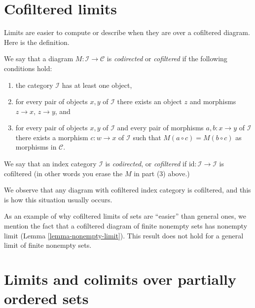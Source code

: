 \section{Cofiltered limits}
\label{section-codirected-limits}

\noindent
Limits are easier to compute or describe when they
are over a cofiltered diagram. Here is the definition.

\begin{definition}
\label{definition-codirected}
We say that a diagram $M : \mathcal{I} \to \mathcal{C}$ is {\it codirected}
or {\it cofiltered} if the following conditions hold:
\begin{enumerate}
\item the category $\mathcal{I}$ has at least one object,
\item for every pair of objects $x, y$ of $\mathcal{I}$
there exists an object $z$ and morphisms $z \to x$,
$z \to y$, and
\item for every pair of objects $x, y$ of $\mathcal{I}$
and every pair of morphisms $a, b : x \to y$ of $\mathcal{I}$
there exists a morphism $c : w \to x$ of $\mathcal{I}$
such that $M(a \circ c) = M(b \circ c)$ as morphisms in $\mathcal{C}$.
\end{enumerate}
We say that an index category $\mathcal{I}$ is {\it codirected}, or
{\it cofiltered} if $\text{id} : \mathcal{I} \to \mathcal{I}$ is
cofiltered (in other words you erase the $M$ in part (3) above.)
\end{definition}

\noindent
We observe that any diagram with cofiltered index category is cofiltered,
and this is how this situation usually occurs.

\medskip\noindent
As an example of why cofiltered limits of sets are ``easier'' than
general ones, we mention the fact that a cofiltered diagram of finite
nonempty sets has nonempty limit (Lemma \ref{lemma-nonempty-limit}).
This result does not hold for a general limit of finite
nonempty sets.












\section{Limits and colimits over partially ordered sets}
\label{section-posets-limits}

